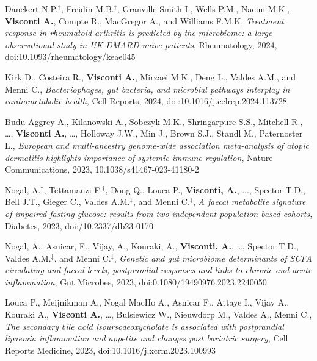 {\begin{itemize}
		 Danckert N.P.$^{\textbf{$\dag $}}$, Freidin M.B.$^{\textbf{$\dag $}}$, Granville Smith I., Wells P.M., Naeini M.K., \textbf{Visconti A.}, Compte R., MacGregor A., and Williams F.M.K, \emph{Treatment response in rheumatoid arthritis is predicted by the microbiome: a large observational study in UK DMARD-naïve patients}, Rheumatology, 2024, doi:10.1093/rheumatology/keae045
		
		 Kirk D., Costeira R., \textbf{Visconti A.}, Mirzaei M.K., Deng L., Valdes A.M., and Menni C., \emph{Bacteriophages, gut bacteria, and microbial pathways interplay in cardiometabolic health}, Cell Reports, 2024, doi:10.1016/j.celrep.2024.113728		
		
		  Budu-Aggrey A., Kilanowski A., Sobczyk M.K., Shringarpure S.S., Mitchell R., \dots,  \textbf{Visconti A.}, \dots, Holloway J.W., Min J., Brown S.J., Standl M., Paternoster L., \emph{European and multi-ancestry genome-wide association meta-analysis of atopic dermatitis highlights importance of systemic immune regulation}, Nature Communications, 2023, 10.1038/s41467-023-41180-2
		
		 Nogal, A.$^{\textbf{$\dag $}}$, Tettamanzi F.$^{\textbf{$\dag $}}$, Dong Q., Louca P., \textbf{Visconti, A.}, ...,  Spector T.D., Bell J.T., Gieger C., Valdes A.M.$^{\textbf{$\ddag $}}$, and Menni C.$^{\textbf{$\ddag $}}$, \emph{A faecal metabolite signature of impaired fasting glucose: results from two independent population-based cohorts}, Diabetes, 2023, doi:/10.2337/db23-0170
		
		 Nogal, A., Asnicar, F., Vijay, A., Kouraki, A., \textbf{Visconti, A.}, \dots, Spector T.D., Valdes A.M.$^{\textbf{$\ddag $}}$, and Menni C.$^{\textbf{$\ddag $}}$, \emph{Genetic and gut microbiome determinants of SCFA circulating and faecal levels, postprandial responses and links to chronic and acute inflammation}, Gut Microbes, 2023, doi:0.1080/19490976.2023.2240050
		
		 Louca P., Meijnikman A., Nogal MacHo A., Asnicar F., Attaye I., Vijay A., Kouraki A., \textbf{Visconti A.}, \dots, Bulsiewicz W., Nieuwdorp M., Valdes A., Menni C., \emph{The secondary bile acid isoursodeoxycholate is associated with postprandial lipaemia inflammation and appetite and changes post bariatric surgery}, Cell Reports Medicine, 2023, doi:10.1016/j.xcrm.2023.100993							

	\end{itemize}
}

